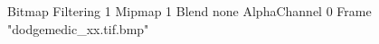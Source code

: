 {Bitmap
	{Filtering 1}
	{Mipmap 1}
	{Blend none}
	{AlphaChannel 0}
	{Frame "dodgemedic_xx.tif.bmp"}
}
